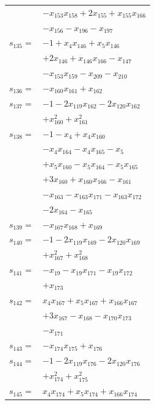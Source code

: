 \begin{longtable}{@{}r@{\;}l@{}}
 & \(\displaystyle -x_{153}x_{158} +2x_{155} +x_{155}x_{166}\) \\
 & \(\displaystyle -x_{156} -x_{196} -x_{197}\) \\[3pt]
\(s_{135}=\) & \(\displaystyle -1 +x_{4}x_{146} +x_{5}x_{146}\) \\
 & \(\displaystyle +2x_{146} +x_{146}x_{166} -x_{147}\) \\
 & \(\displaystyle -x_{153}x_{159} -x_{209} -x_{210}\) \\[3pt]
\(s_{136}=\) & \(\displaystyle -x_{160}x_{161} +x_{162}\) \\[3pt]
\(s_{137}=\) & \(\displaystyle -1 -2x_{119}x_{162} -2x_{120}x_{162}\) \\
 & \(\displaystyle +x_{160}^{2} +x_{161}^{2}\) \\[3pt]
\(s_{138}=\) & \(\displaystyle -1 -x_{4} +x_{4}x_{160}\) \\
 & \(\displaystyle -x_{4}x_{164} -x_{4}x_{165} -x_{5}\) \\
 & \(\displaystyle +x_{5}x_{160} -x_{5}x_{164} -x_{5}x_{165}\) \\
 & \(\displaystyle +3x_{160} +x_{160}x_{166} -x_{161}\) \\
 & \(\displaystyle -x_{163} -x_{163}x_{171} -x_{163}x_{172}\) \\
 & \(\displaystyle -2x_{164} -x_{165}\) \\[3pt]
\(s_{139}=\) & \(\displaystyle -x_{167}x_{168} +x_{169}\) \\[3pt]
\(s_{140}=\) & \(\displaystyle -1 -2x_{119}x_{169} -2x_{120}x_{169}\) \\
 & \(\displaystyle +x_{167}^{2} +x_{168}^{2}\) \\[3pt]
\(s_{141}=\) & \(\displaystyle -x_{19} -x_{19}x_{171} -x_{19}x_{172}\) \\
 & \(\displaystyle +x_{173}\) \\[3pt]
\(s_{142}=\) & \(\displaystyle x_{4}x_{167} +x_{5}x_{167} +x_{166}x_{167}\) \\
 & \(\displaystyle +3x_{167} -x_{168} -x_{170}x_{173}\) \\
 & \(\displaystyle -x_{171}\) \\[3pt]
\(s_{143}=\) & \(\displaystyle -x_{174}x_{175} +x_{176}\) \\[3pt]
\(s_{144}=\) & \(\displaystyle -1 -2x_{119}x_{176} -2x_{120}x_{176}\) \\
 & \(\displaystyle +x_{174}^{2} +x_{175}^{2}\) \\[3pt]
\(s_{145}=\) & \(\displaystyle x_{4}x_{174} +x_{5}x_{174} +x_{166}x_{174}\) \\

\end{longtable}
